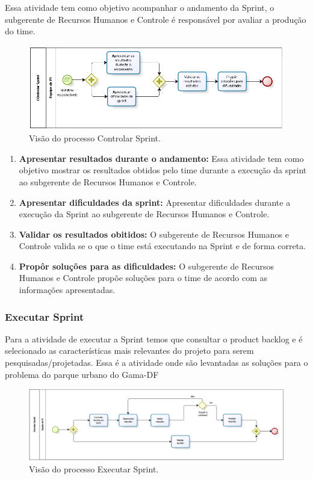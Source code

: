 Essa atividade tem como objetivo acompanhar o andamento da Sprint, o subgerente de Recursos Humanos e Controle é responsável por avaliar a produção do time.

\begin{figure}[H]
	\centering
	\label{Visão do processo Controlar Sprint}
		\includegraphics[keepaspectratio=true,scale=0.7,angle=360]{processo/controlarSprint.png}
	\caption{Visão do processo Controlar Sprint.}
\end{figure}

\begin{enumerate}
	\item \textbf{Apresentar resultados durante o andamento:}
	Essa atividade tem como objetivo mostrar os resultados obtidos pelo time durante a execução da sprint ao subgerente de Recursos Humanos e Controle.
	\item \textbf{Apresentar dificuldades da sprint:}
	Apresentar dificuldades durante a execução da Sprint ao subgerente de Recursos Humanos e Controle.
	\item \textbf{Validar os resultados obitidos:}
	O subgerente de Recursos Humanos e Controle valida se o que o time está executando na Sprint e de forma correta.
	\item \textbf{Propôr soluções para as dificuldades:}
	O subgerente de Recursos Humanos e Controle propõe soluções para o time de acordo com as informações apresentadas.
\end{enumerate}

\subsubsection{Executar Sprint}

Para a atividade de executar a Sprint temos que consultar o product backlog e é selecionado as características mais relevantes do projeto para serem pesquisadas/projetadas. Essa é a atividade onde são levantadas as soluções para o problema do parque urbano do Gama-DF

\begin{figure}[H]
	\centering
	\label{Visão do processo Executar Sprint}
		\includegraphics[keepaspectratio=true,scale=0.5,angle=360]{processo/executarSprint.png}
	\caption{Visão do processo Executar Sprint.}
\end{figure}

